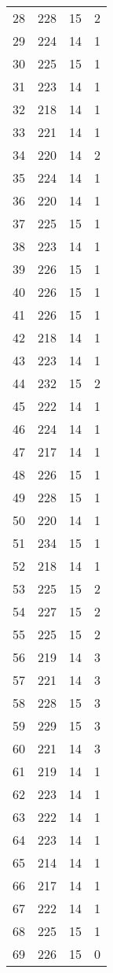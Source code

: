 \begin{longtable}[!]{c|ccc}
	28	& 228	& 15	& 2	\\
	29	& 224	& 14	& 1	\\
	30	& 225	& 15	& 1	\\
	31	& 223	& 14	& 1	\\
	32	& 218	& 14	& 1	\\
	33	& 221	& 14	& 1	\\
	34	& 220	& 14	& 2	\\
	35	& 224	& 14	& 1	\\
	36	& 220	& 14	& 1	\\
	37	& 225	& 15	& 1	\\
	38	& 223	& 14	& 1	\\
	39	& 226	& 15	& 1	\\
	40	& 226	& 15	& 1	\\
	41	& 226	& 15	& 1	\\
	42	& 218	& 14	& 1	\\
	43	& 223	& 14	& 1	\\
	44	& 232	& 15	& 2	\\
	45	& 222	& 14	& 1	\\
	46	& 224	& 14	& 1	\\
	47	& 217	& 14	& 1	\\
	48	& 226	& 15	& 1	\\
	49	& 228	& 15	& 1	\\
	50	& 220	& 14	& 1	\\
	51	& 234	& 15	& 1	\\
	52	& 218	& 14	& 1	\\
	53	& 225	& 15	& 2	\\
	54	& 227	& 15	& 2	\\
	55	& 225	& 15	& 2	\\
	56	& 219	& 14	& 3	\\
	57	& 221	& 14	& 3	\\
	58	& 228	& 15	& 3	\\
	59	& 229	& 15	& 3	\\
	60	& 221	& 14	& 3	\\
	61	& 219	& 14	& 1	\\
	62	& 223	& 14	& 1	\\
	63	& 222	& 14	& 1	\\
	64	& 223	& 14	& 1	\\
	65	& 214	& 14	& 1	\\
	66	& 217	& 14	& 1	\\
	67	& 222	& 14	& 1	\\
	68	& 225	& 15	& 1	\\
	69	& 226	& 15	& 0	\\

\end{longtable}
